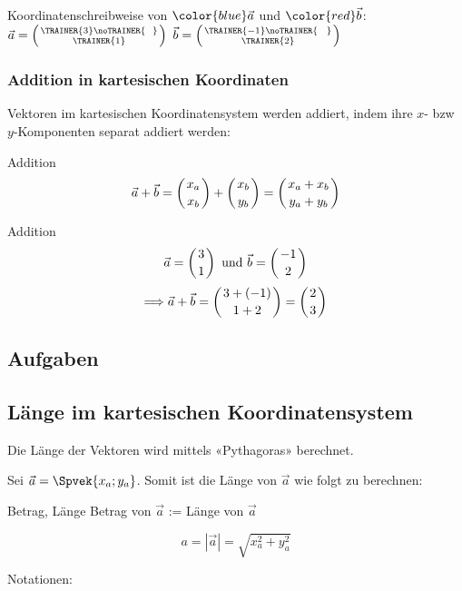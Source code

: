 Koordinatenschreibweise von $\color{blue}\vec{a}$ und $\color{red}\vec{b}$:\,\,
$\vec{a} = \left( \TRAINER{3}\noTRAINER{\,\,\,\,} \atop \TRAINER{1} \right)$
$\vec{b} = \left( \TRAINER{-1}\noTRAINER{\,\,\,\,\,} \atop \TRAINER{2} \right)$
\newpage
\subsubsection{Addition in kartesischen Koordinaten}
Vektoren im kartesischen Koordinatensystem werden addiert, indem ihre
$x$- bzw $y$-Komponenten separat addiert werden:

\begin{gesetz}{Addition}{}
$$\vec{a} + \vec{b} =   \left(x_a \atop x_b \right)  + \left( x_b \atop y_b \right) =
  \left( x_a + x_b \atop y_a + y_b \right)$$
  \end{gesetz}

\begin{beispiel}{Addition}{}
  $$\vec{a} = \left(3\atop 1\right) \text{ und } \vec{b} = \left(-1
  \atop 2\right)$$
  $$\Longrightarrow \vec{a} + \vec{b} = \left(3 + (-1) \atop 1 +
  2\right) = \left(2 \atop 3\right)$$
  \end{beispiel}

\TRAINER{\vspace{6cm}}

\subsection*{Aufgaben}    
\newpage




\newpage

\subsection{Länge im kartesischen Koordinatensystem}

Die Länge der Vektoren wird mittels «Pythagoras» berechnet.

Sei $\vec{a}  = \Spvek{x_a;y_a}$. Somit ist die Länge von
    $\vec{a}$ wie folgt zu berechnen:

    \begin{gesetz}{Betrag, Länge}{}
      Betrag von $\vec{a}$ := Länge von $\vec{a}$

      $$a = |\vec{a}| = \sqrt{x_a^2 + y_a^2}$$
      \end{gesetz}
    Notationen:

